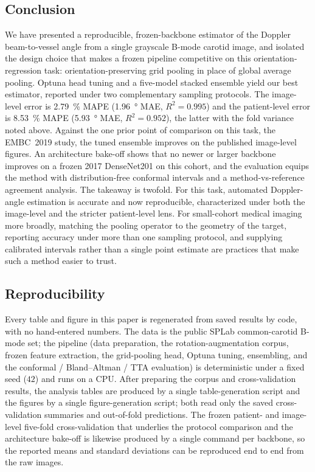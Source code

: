 \subsection{Conclusion}

We have presented a reproducible, frozen-backbone estimator of the Doppler
beam-to-vessel angle from a single grayscale B-mode carotid image, and isolated the
design choice that makes a frozen pipeline competitive on this orientation-regression
task: orientation-preserving grid pooling in place of global average pooling. Optuna
head tuning and a five-model stacked ensemble yield our best estimator, reported
under two complementary sampling protocols. The image-level error is
\SI{2.79}{\percent} MAPE (\SI{1.96}{\degree} MAE, $R^2=0.995$) and the patient-level
error is \SI{8.53}{\percent} MAPE (\SI{5.93}{\degree} MAE, $R^2=0.952$), the latter
with the fold variance noted above. Against the one prior point of comparison on this
task, the EMBC~2019 study, the tuned ensemble improves on the published image-level
figures. An architecture bake-off shows that no newer or larger backbone improves on
a frozen 2017 DenseNet201 on this cohort, and the evaluation equips the method with
distribution-free conformal intervals and a method-vs-reference agreement analysis.
The takeaway is twofold. For this task, automated Doppler-angle estimation is
accurate and now reproducible, characterized under both the image-level and the
stricter patient-level lens. For small-cohort medical imaging more broadly, matching
the pooling operator to the geometry of the target, reporting accuracy under more
than one sampling protocol, and supplying calibrated intervals rather than a single
point estimate are practices that make such a method easier to trust.

\subsection*{Reproducibility}

Every table and figure in this paper is regenerated from saved results by code, with
no hand-entered numbers. The data is the public SPLab common-carotid B-mode set; the
pipeline (data preparation, the rotation-augmentation corpus, frozen feature
extraction, the grid-pooling head, Optuna tuning, ensembling, and the conformal /
Bland--Altman / TTA evaluation) is deterministic under a fixed seed ($42$) and runs
on a CPU. After preparing the corpus and cross-validation results, the analysis
tables are produced by a single table-generation script and the figures by a single
figure-generation script; both read only the saved cross-validation summaries and
out-of-fold predictions. The frozen patient- and image-level five-fold
cross-validation that underlies the protocol comparison and the architecture bake-off
is likewise produced by a single command per backbone, so the reported means and
standard deviations can be reproduced end to end from the raw images.
